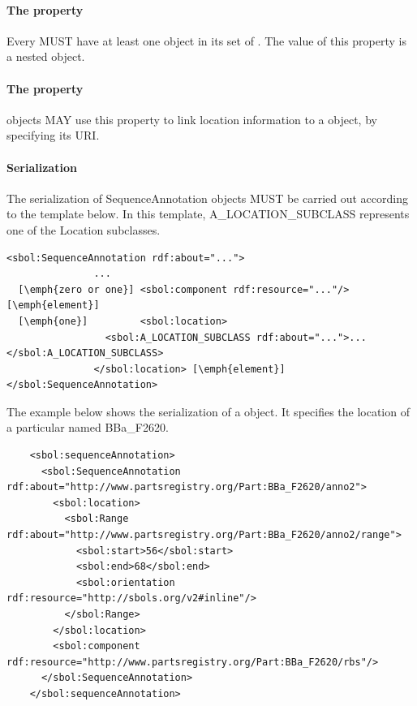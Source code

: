 \paragraph{The  property}\label{sec:locations}
\label{sec:locations}
Every  MUST have at least one  object in its set of . The value of this property is a nested  object.


\paragraph{The  property}\label{sec:component}
 objects MAY use this property to link location information to a  object, by specifying its URI.


\paragraph{Serialization}

The serialization of SequenceAnnotation objects MUST be carried out according to the template below. In this template, A\_LOCATION\_SUBCLASS represents one of the Location subclasses.
\begin{lstlisting}
<sbol:SequenceAnnotation rdf:about="...">
               ...   
  [\emph{zero or one}] <sbol:component rdf:resource="..."/> [\emph{element}] 
  [\emph{one}]         <sbol:location>
                 <sbol:A_LOCATION_SUBCLASS rdf:about="...">...</sbol:A_LOCATION_SUBCLASS>
               </sbol:location> [\emph{element}] 
</sbol:SequenceAnnotation>
\end{lstlisting}

The example below shows the serialization of a  object. It specifies the location of a particular  named BBa\_F2620.
\begin{lstlisting}
    <sbol:sequenceAnnotation>
      <sbol:SequenceAnnotation rdf:about="http://www.partsregistry.org/Part:BBa_F2620/anno2">
        <sbol:location>
          <sbol:Range rdf:about="http://www.partsregistry.org/Part:BBa_F2620/anno2/range">
            <sbol:start>56</sbol:start>
            <sbol:end>68</sbol:end>
            <sbol:orientation rdf:resource="http://sbols.org/v2#inline"/>
          </sbol:Range>
        </sbol:location>
        <sbol:component rdf:resource="http://www.partsregistry.org/Part:BBa_F2620/rbs"/>
      </sbol:SequenceAnnotation>
    </sbol:sequenceAnnotation>
\end{lstlisting}

